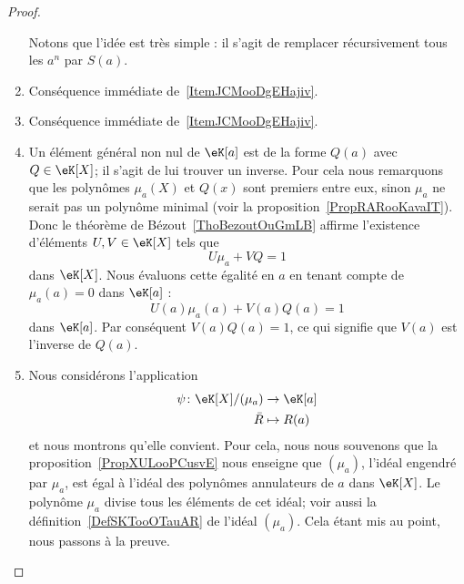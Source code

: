\begin{proof}
\begin{enumerate}
            Notons que l'idée est très simple : il s'agit de remplacer récursivement tous les \( a^n\) par \( S(a)\).
    \item
        Conséquence immédiate de~\ref{ItemJCMooDgEHajiv}.
    \item
        Conséquence immédiate de~\ref{ItemJCMooDgEHajiv}.
    \item
        Un élément général non nul de \( \eK[a]\) est de la forme \( Q(a)\) avec \( Q\in\eK[X]\); il s'agit de lui trouver un inverse. Pour cela nous remarquons que les polynômes \( \mu_a(X)\) et \( Q(x)\) sont premiers entre eux, sinon \( \mu_a\) ne serait pas un polynôme minimal (voir la proposition~\ref{PropRARooKavaIT}). Donc le théorème de Bézout~\ref{ThoBezoutOuGmLB} affirme l'existence d'éléments \( U,V\in \eK[X]\) tels que
        \begin{equation}
            U\mu_a+VQ=1
        \end{equation}
        dans \( \eK[X]\). Nous évaluons cette égalité en \( a\) en tenant compte de \( \mu_a(a)=0\) dans \( \eK[a]\) :
        \begin{equation}
            U(a)\mu_a(a)+V(a)Q(a)=1
        \end{equation}
        dans \( \eK[a]\). Par conséquent \( V(a)Q(a)=1\), ce qui signifie que \( V(a)\) est l'inverse de \( Q(a)\).
        \item
            Nous considérons l'application
            \begin{equation}
                \begin{aligned}
                    \psi\colon \eK[X]/(\mu_a)&\to \eK[a] \\
                    \bar R&\mapsto R(a)
                \end{aligned}
            \end{equation}
            et nous montrons qu'elle convient. Pour cela, nous nous souvenons que la proposition~\ref{PropXULooPCusvE} nous enseigne que \( (\mu_a)\), l'idéal engendré par \( \mu_a\), est égal à l'idéal des polynômes annulateurs de \( a\) dans \( \eK[X]\). Le polynôme \( \mu_a\) divise tous les éléments de cet idéal; voir aussi la définition~\ref{DefSKTooOTauAR} de l'idéal \( (\mu_a)\). Cela étant mis au point, nous passons à la preuve.
\end{enumerate}
\end{proof}
